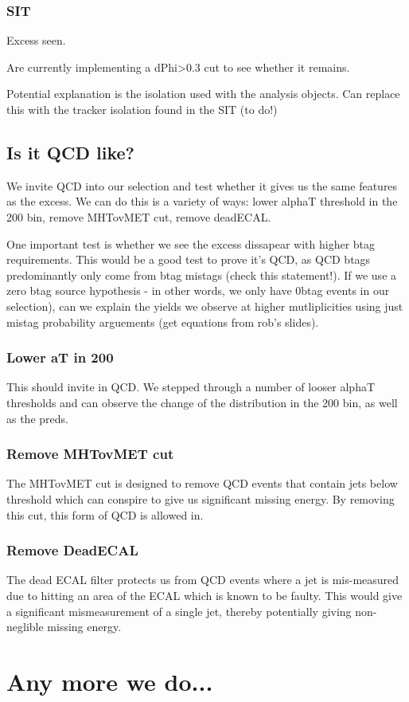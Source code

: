 \subsubsection{SIT}
Excess seen.

Are currently implementing a dPhi>0.3 cut to see whether it remains.

Potential explanation is the isolation used with the analysis objects. Can 
replace this with the tracker isolation found in the SIT (to do!) 

\subsection{Is it QCD like?}
We invite QCD into our selection and test whether it gives us the same features
as the excess. We can do this is a variety of ways: lower alphaT threshold in
the 200 bin, remove MHTovMET cut, remove deadECAL.

One important test is whether we see the excess dissapear with higher btag
requirements. This would be a good test to prove it's QCD, as QCD btags
predominantly only come from btag mistags (check this statement!). If we use
a zero btag source hypothesis - in other words, we only have 0btag events in our
selection), can we explain the yields we observe at higher mutliplicities using
just mistag probability arguements (get equations from rob's slides).

\subsubsection{Lower aT in 200}
This should invite in QCD. We stepped through a number of looser alphaT thresholds
and can observe the change of the distribution in the 200 bin, as well as the preds.

\subsubsection{Remove MHTovMET cut}
The MHTovMET cut is designed to remove QCD events that contain jets below threshold
which can conspire to give us significant missing energy. By removing this cut, this
form of QCD is allowed in.

\subsubsection{Remove DeadECAL}
The dead ECAL filter protects us from QCD events where a jet is mis-measured due
to hitting an area of the ECAL which is known to be faulty. This would give a
significant mismeasurement of a single jet, thereby potentially giving non-neglible
missing energy.

\section{Any more we do...}
